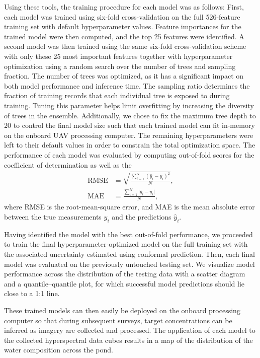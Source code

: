 \documentclass[remotesensing,article,accept,pdftex,moreauthors]{Definitions/mdpi}
\begin{document}
Using these tools, the training procedure for each model was as follows: First, each model was trained using six-fold cross-validation on the full 526-feature training set with default hyperparameter values. Feature importances for the trained model were then computed, and the top 25 features were identified. A second model was then trained using the same six-fold cross-validation scheme with only these 25 most important features together with hyperparameter optimization using a random search over the number of trees and sampling fraction. The number of trees was optimized, as it has a significant impact on both model performance and inference time. The sampling ratio determines the fraction of training records that each individual tree is exposed to during training. Tuning this parameter helps limit overfitting by increasing the diversity of trees in the ensemble. Additionally, we chose to fix the maximum tree depth to 20 to control the final model size such that each trained model can fit in-memory on the onboard UAV processing computer. The remaining hyperparameters were left to their default values in order to constrain the total optimization space. The performance of each model was evaluated by computing out-of-fold scores for the coefficient of determination as well as the
\begin{align}
    \text{RMSE} &= \sqrt{\frac{\sum\limits_{i=1}^N (\hat{y}_i-y_i)^2}{N}}, \\
    \text{MAE} &= \frac{\sum\limits_{i=1}^N \lvert \hat{y}_i - y_i \vert}{N},
\end{align}
where RMSE is the root-mean-square error, and MAE is the mean absolute error between the true measurements $y_i$ and the predictions $\hat{y}_i$.

Having identified the model with the best out-of-fold performance, we proceeded to train the final hyperparameter-optimized model on the full training set with the associated uncertainty estimated using conformal prediction.  Then, each final model was evaluated on the previously untouched testing set. We visualize model performance across the distribution of the testing data with a scatter diagram and a quantile--quantile plot, for which successful model predictions should lie close to a 1:1 line.

These trained models can then easily be deployed on the onboard processing computer so that during subsequent surveys, target concentrations can be inferred as imagery are collected and processed. The application of each model to the collected hyperspectral data cubes results in a map of the distribution of the water composition across the pond.
\end{document}
